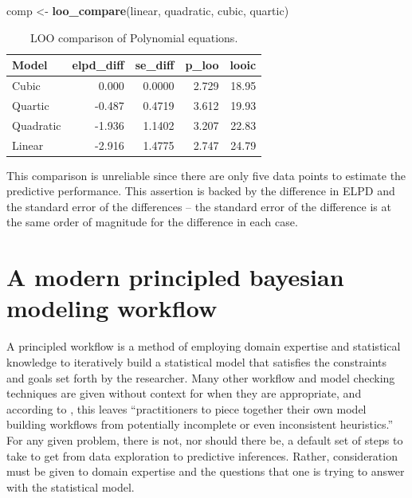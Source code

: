 \documentclass[11pt, oneside, openany]{scrbook}
\newenvironment{Shaded}{\begin{snugshade}}{\end{snugshade}}
\newcommand{\FunctionTok}[1]{\textcolor[rgb]{0.13,0.29,0.53}{\textbf{#1}}}
\newcommand{\NormalTok}[1]{#1}
\newcommand{\OtherTok}[1]{\textcolor[rgb]{0.56,0.35,0.01}{#1}}
\begin{document}
\begin{Shaded}
\begin{Highlighting}[]
\NormalTok{comp }\OtherTok{\textless{}{-}} \FunctionTok{loo\_compare}\NormalTok{(linear, quadratic, cubic, quartic)}
\end{Highlighting}
\end{Shaded}

\begin{table}[!h]
\centering
\caption{\label{tab:ch030-Galaxy-Itchy}LOO comparison of Polynomial equations.}
\centering
\begin{tabular}[t]{lrrrr}
\toprule
Model & elpd\_diff & se\_diff & p\_loo & looic\\
\midrule
Cubic & 0.000 & 0.0000 & 2.729 & 18.95\\
Quartic & -0.487 & 0.4719 & 3.612 & 19.93\\
Quadratic & -1.936 & 1.1402 & 3.207 & 22.83\\
Linear & -2.916 & 1.4775 & 2.747 & 24.79\\
\bottomrule
\end{tabular}
\end{table}

This comparison is unreliable since there are only five data points to estimate the predictive performance. This assertion is backed by the difference in ELPD and the standard error of the differences -- the standard error of the difference is at the same order of magnitude for the difference in each case.

\hypertarget{a-modern-principled-bayesian-modeling-workflow}{%
\section{A modern principled bayesian modeling workflow}\label{a-modern-principled-bayesian-modeling-workflow}}

A principled workflow is a method of employing domain expertise and statistical knowledge to iteratively build a statistical model that satisfies the constraints and goals set forth by the researcher. Many other workflow and model checking techniques are given without context for when they are appropriate, and according to \citet{betancourt2020}, this leaves ``practitioners to piece together their own model building workflows from potentially incomplete or even inconsistent heuristics.'' For any given problem, there is not, nor should there be, a default set of steps to take to get from data exploration to predictive inferences. Rather, consideration must be given to domain expertise and the questions that one is trying to answer with the statistical model.
\end{document}
